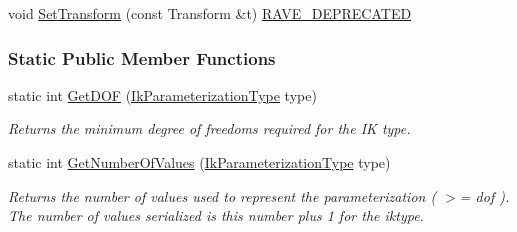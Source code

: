 \begin{Indent}{\bf }\par
{\em \label{_amgrpd41d8cd98f00b204e9800998ecf8427e}
 }\begin{DoxyCompactItemize}
\item 
void \hyperlink{classOpenRAVE_1_1IkParameterization_a7526eb60609136e3393811ad4a28ca40}{SetTransform} (const Transform \&t) \hyperlink{classOpenRAVE_1_1IkParameterization_a63fa0d3744e7eebf98b264ad1242bfad}{RAVE\_\-DEPRECATED}
\end{DoxyCompactItemize}
\end{Indent}
\subsubsection*{Static Public Member Functions}
\begin{DoxyCompactItemize}
\item 
\hypertarget{classOpenRAVE_1_1IkParameterization_a14e61929c0affee6b5ebd14889aff297}{
static int \hyperlink{classOpenRAVE_1_1IkParameterization_a14e61929c0affee6b5ebd14889aff297}{GetDOF} (\hyperlink{namespaceOpenRAVE_a16f7833e516a35d385ac594a44e44a2e}{IkParameterizationType} type)}
\label{classOpenRAVE_1_1IkParameterization_a14e61929c0affee6b5ebd14889aff297}

\begin{DoxyCompactList}\small\item\em Returns the minimum degree of freedoms required for the IK type. \item\end{DoxyCompactList}\item 
\hypertarget{classOpenRAVE_1_1IkParameterization_aba838fc410e5033a481e33d594ac72bd}{
static int \hyperlink{classOpenRAVE_1_1IkParameterization_aba838fc410e5033a481e33d594ac72bd}{GetNumberOfValues} (\hyperlink{namespaceOpenRAVE_a16f7833e516a35d385ac594a44e44a2e}{IkParameterizationType} type)}
\label{classOpenRAVE_1_1IkParameterization_aba838fc410e5033a481e33d594ac72bd}

\begin{DoxyCompactList}\small\item\em Returns the number of values used to represent the parameterization ( $>$= dof ). The number of values serialized is this number plus 1 for the iktype. \item\end{DoxyCompactList}\end{DoxyCompactItemize}


